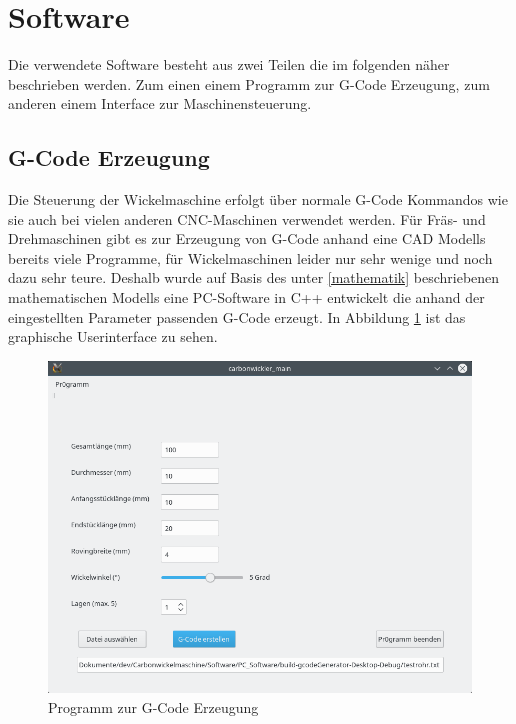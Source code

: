 \documentclass[paper=A4,pagesize,DIV=18, 12pt,listof=totoc,bibliography=totoc,headings=optiontohead,open=any]{article}
\begin{document}
\section{Software}
Die verwendete Software besteht aus zwei Teilen die im folgenden näher beschrieben werden. Zum einen einem Programm zur G-Code Erzeugung, zum anderen einem Interface zur Maschinensteuerung.
\subsection{G-Code Erzeugung}
\label{software}
Die Steuerung der Wickelmaschine erfolgt über normale G-Code Kommandos wie sie auch bei vielen anderen CNC-Maschinen verwendet werden. Für Fräs- und Drehmaschinen gibt es zur Erzeugung von G-Code anhand eine CAD Modells bereits viele Programme, für Wickelmaschinen leider nur sehr wenige und noch dazu sehr teure. Deshalb wurde auf Basis des unter \ref{mathematik} beschriebenen mathematischen Modells eine PC-Software in C++ entwickelt die  anhand der eingestellten Parameter passenden G-Code erzeugt. In Abbildung \ref{fig:g-code} ist das graphische Userinterface zu sehen. 
\begin{figure}[H]
	\centering
	\includegraphics[width=1\textwidth]{bilder/carbowickler_software.png}
	\caption{Programm zur G-Code Erzeugung} 
	\label{fig:g-code}
\end{figure}
\end{document}
